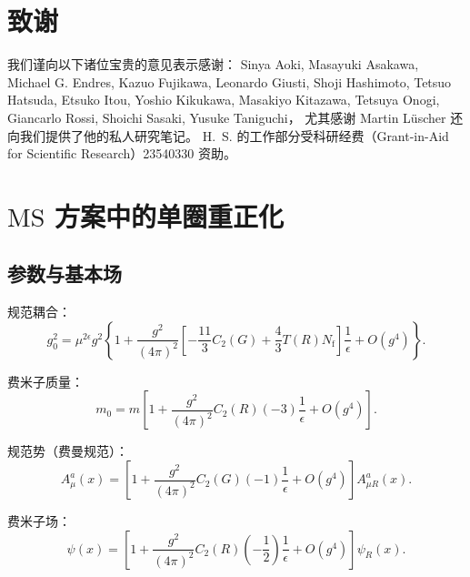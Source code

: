 \section*{致谢}
我们谨向以下诸位宝贵的意见表示感谢：
Sinya Aoki,
Masayuki Asakawa,
Michael G. Endres,
Kazuo Fujikawa,
Leonardo Giusti,
Shoji Hashimoto,
Tetsuo Hatsuda,
Etsuko Itou,
Yoshio Kikukawa,
Masakiyo Kitazawa,
Tetsuya Onogi,
Giancarlo Rossi,
Shoichi Sasaki,
Yusuke Taniguchi，
尤其感谢
Martin L\"uscher
还向我们提供了他的私人研究笔记。
H.~S. 的工作部分受科研经费（Grant-in-Aid for Scientific Research）23540330 资助。

\appendix

\section{$\text{MS}$ 方案中的单圈重正化}
\label{sec:A}
\subsection{参数与基本场}
规范耦合：
\begin{equation}
   g_0^2=\mu^{2\epsilon}g^2
   \left\{
   1+\frac{g^2}{(4\pi)^2}\left[-\frac{11}{3}C_2(G)+\frac{4}{3}T(R)N_{\mathrm{f}}\right]
   \frac{1}{\epsilon}+O(g^4)
   \right\}.
\label{eq:(A1)}
\end{equation}

费米子质量：
\begin{equation}
   m_0=m
   \left[
   1+\frac{g^2}{(4\pi)^2}C_2(R)(-3)
   \frac{1}{\epsilon}+O(g^4)
   \right].
\label{eq:(A2)}
\end{equation}

规范势（费曼规范）：
\begin{equation}
   A_\mu^a(x)=\left[1+\frac{g^2}{(4\pi)^2}C_2(G)(-1)
   \frac{1}{\epsilon}+O(g^4)\right]A_{\mu R}^a(x).
\label{eq:(A3)}
\end{equation}

费米子场：
\begin{equation}
   \psi(x)=
   \left[1+\frac{g^2}{(4\pi)^2}C_2(R)\left(-\frac{1}{2}\right)
   \frac{1}{\epsilon}+O(g^4)\right]
   \psi_R(x).
\label{eq:(A4)}
\end{equation}

